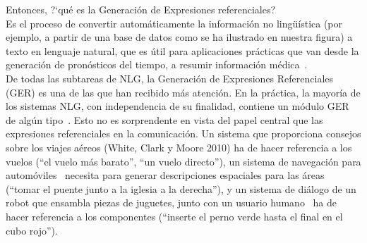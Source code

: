 Entonces,  ?`qu\'e es la Generaci\'on de Expresiones referenciales? \\

Es el proceso de convertir autom\'aticamente la informaci\'on no ling\"u\'{i}stica (por ejemplo, a partir de una base de datos como se ha ilustrado en nuestra figura) a texto en lenguaje natural, que es \'util para aplicaciones pr\'acticas que van desde la generaci\'on de pron\'osticos del tiempo, a resumir informaci\'on m\'edica~\cite{dale2000}. \\

De todas las subtareas de NLG, la Generaci\'on de Expresiones Referenciales (GER) es
una de las que han recibido m\'as atenci\'on. En la pr\'actica, la mayor\'ia de los
sistemas NLG, con independencia de su finalidad,
contiene un m\'odulo GER de alg\'un tipo~\cite{Mellish2004}. Esto no es sorprendente
en vista del papel central que las expresiones referenciales en la comunicaci\'on. Un sistema que proporciona
consejos sobre los viajes a\'ereos (White, Clark y Moore 2010) ha de hacer referencia a los vuelos (``el
vuelo m\'as barato'', ``un vuelo directo''), un sistema de navegaci\'on para autom\'oviles~\cite{Drager:2012:GLN:2380816.2380908}
necesita para generar descripciones espaciales para las \'areas (``tomar el puente junto a la iglesia a la derecha''),
y un sistema de di\'alogo de un robot que ensambla piezas de juguetes, junto con un usuario humano~\cite{foster-etal-ijcai2009} ha de hacer referencia a los componentes (``inserte el perno verde hasta el final en el cubo rojo'').\\
